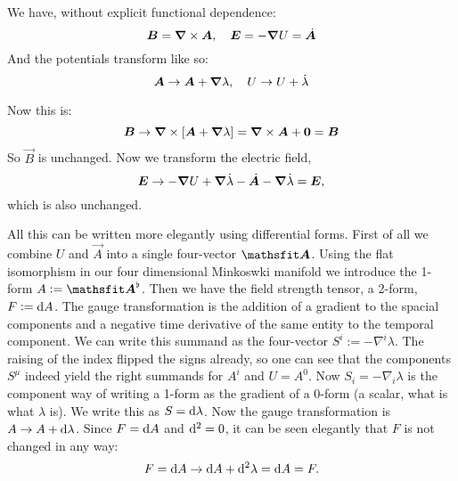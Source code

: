 \documentclass[11pt, ngerman, fleqn, DIV=15, headinclude, BCOR=1cm]{scrartcl}
\begin{document}
We have, without explicit functional dependence:
\[
    \boldsymbol{B} = \boldsymbol{\nabla} \times \boldsymbol{A}
    ,\quad
    \boldsymbol{E} = - \boldsymbol{\nabla} U = \dot{\boldsymbol{A}}
\]
And the potentials transform like so:
\[
    \boldsymbol{A} \to \boldsymbol{A} + \boldsymbol{\nabla} \lambda
    ,\quad
    U \to U + \dot \lambda
\]

Now this is:
\[
    \vec B \to \curl \sbr{\vec A + \vnabla \lambda} = \curl \vec A + \vec 0 =
    \vec B
\]
So $\vec B$ is unchanged. Now we transform the electric field,
\[
    \boldsymbol{E} \to - \boldsymbol{\nabla} U + \boldsymbol{\nabla} \dot \lambda - \dot{\boldsymbol{A}} - \boldsymbol{\nabla} \dot
    \lambda = \boldsymbol{E},
\]
which is also unchanged.

All this can be written more elegantly using differential forms. First of all
we combine $U$ and $\vec A$ into a single four-vector $\tens A$. Using the flat
isomorphism in our four dimensional Minkoswki manifold we introduce the 1-form
$A := \tens A^\flat$. Then we have the field strength tensor, a 2-form, $F :=
\dif A$. The gauge transformation is the addition of a gradient to the spacial
components and a negative time derivative of the same entity to the temporal
component. We can write this summand as the four-vector $S^i := - \nabla^i
\lambda$. The raising of the index flipped the signs already, so one can see
that the components $S^\mu$ indeed yield the right summands for $A^i$ and $U =
A^0$. Now $S_i = - \nabla_i \lambda$ is the component way of writing a 1-form
as the gradient of a 0-form (a scalar, what is what $\lambda$ is). We write
this as $S = \dif \lambda$. Now the gauge transformation is $A \to A + \dif
\lambda$. Since $F = \dif A$ and $\dif{^2} = 0$, it can be seen elegantly that
$F$ is not changed in any way:
\[
    F = \dif A \to \dif A + \dif{^2} \lambda = \dif A = F.
\]
\end{document}
